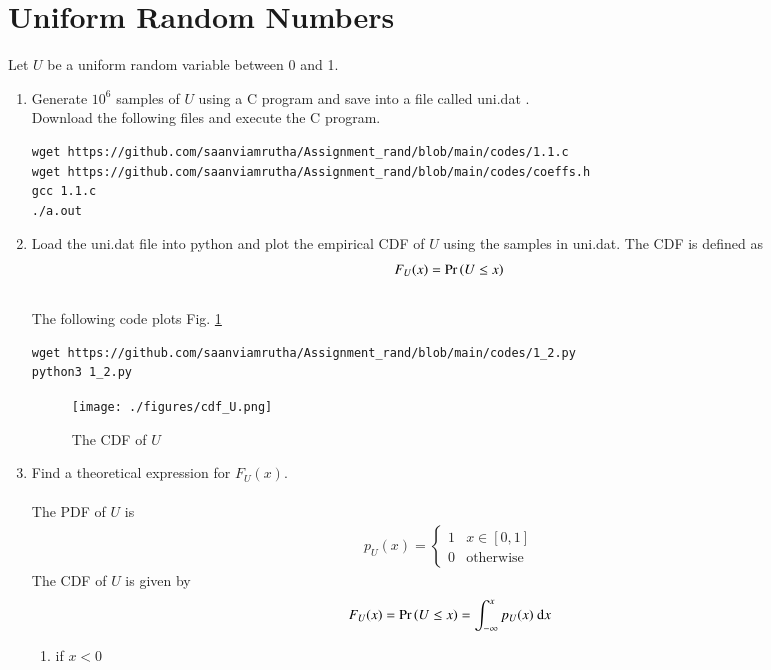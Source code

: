 \documentclass[journal,12pt,twocolumn]{IEEEtran}
\renewcommand\thesection{\arabic{section}}
\begin{document}
\section{Uniform Random Numbers}
Let $U$ be a uniform random variable between 0 and 1.
\begin{enumerate}[label=\thesection.\arabic*
,ref=\thesection.\theenumi]
\item Generate $10^6$ samples of $U$ using a C program and save into a file called uni.dat .
\\
\solution Download the following files and execute the  C program.
\begin{lstlisting}
wget https://github.com/saanviamrutha/Assignment_rand/blob/main/codes/1.1.c
wget https://github.com/saanviamrutha/Assignment_rand/blob/main/codes/coeffs.h
gcc 1.1.c
./a.out
\end{lstlisting}
%
\item
Load the uni.dat file into python and plot the empirical CDF of $U$ using the samples in uni.dat. The CDF is defined as
\begin{align}
F_{U}(x) = \Pr\left(U \le x\right)
\end{align}
\\
\solution  The following code plots Fig. \ref{fig:uni_cdf}
\begin{lstlisting}
wget https://github.com/saanviamrutha/Assignment_rand/blob/main/codes/1_2.py
python3 1_2.py
\end{lstlisting}
\begin{figure}
\centering
\texttt{[image: ./figures/cdf\_U.png]}
\caption{The CDF of $U$}
\label{fig:uni_cdf}
\end{figure}
\item
Find a  theoretical expression for $F_{U}(x)$.\\
\solution \\
The PDF of $U$ is
	\begin{align}
		p_{U}(x) = 
		\begin{cases}
			1 & x \in [0, 1] \\
			0 & \text{otherwise}
		\end{cases}
	\end{align}
The CDF of $U$ is given by
	\begin{align}
		F_{U}(x) = \Pr\left(U \le x\right) = \int_{-\infty}^x p_{U}(x) ~\mathrm{d}x
	\end{align}
\begin{enumerate}[label=case.\arabic*:]
    \item if $x<0$
    \begin{align}

\end{align}
\end{enumerate}
\end{enumerate}
\end{document}
